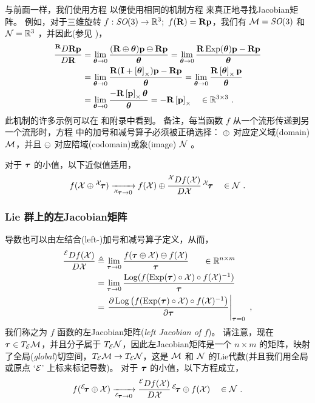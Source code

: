 与前面一样，我们使用方程  以便使用相同的机制方程  来真正地寻找Jacobian矩阵。
%
%
%
例如，对于三维旋转 $f:\textit{SO}(3)\to{\mathbb R}^3;~f({\bf R})={\bf R}{\bf p}$，我们有 $\mathcal{M}=\textit{SO}(3)$ 和 $\mathcal{N}={\mathbb R}^3$ ，并因此(参见 )， 
%
\begin{align*}
\rdpar{\bfR\bfp}{\bfR}
 &= \lim_{\bth\to0}\frac{(\bfR\op\bth)\bfp\om\bfR\bfp}{\bth} 
 = \lim_{\bth\to0}\frac{\bfR\Exp(\bth)\bfp-\bfR\bfp}{\bth} \\
 &= \lim_{\bth\to0}\frac{\bfR(\bfI+\hatx{\bth})\bfp-\bfR\bfp}{\bth} 
 = \lim_{\bth\to0}\frac{\bfR\hatx{\bth}\bfp}{\bth} \\
 &= \lim_{\bth\to0}\frac{-\bfR\hatx{\bfp}\bth}{\bth} 
 = -\bfR\hatx{\bfp} 
 ~~~\in \bbR^{3\times 3}
 ~.
\end{align*}
%
此机制的许多示例可以在  和附录中看到。
%
备注，每当函数 $f$ 从一个流形传递到另一个流形时，方程  中的加号和减号算子必须被正确选择：
$\oplus$ 对应定义域(domain) $\mathcal{M}$，并且 $\ominus$ 对应陪域(codomain)或象(image) $\mathcal{N}$ 。


对于 ${\bm \tau}$ 的小值，以下近似值适用，
%
\begin{align}\label{equ:lin_approx}
f(\cX\op{^\cX\!\bftau}) \xrightarrow[{^\cX\!\bftau}\to0]{} f(\cX)\op\rdpar{f(\cX)}{\cX}\,{^\cX\!\bftau}
\quad \in \cN
~.
\end{align}
%



\subsubsection{Lie 群上的左Jacobian矩阵}

导数也可以由左结合(left-)加号和减号算子定义，从而，
%
\begin{align}\label{equ:left-Jacobian}
\ldpar{f(\cX)}{\cX} 
& \te \lim_{\bftau\to0}\frac{f(\bftau\op\cX)\om f(\cX)}{\bftau}  
~~~~~\in\bbR^{n\times m}
\\
& = \lim_{\bftau\to0}\frac{\Log(f(\Exp(\bftau)\circ\cX) \circ f(\cX)\inv)}{\bftau} \notag
\\
&= \pjac{\Log\big(f(\Exp(\bftau)\circ\cX) \circ f(\cX)\inv\big)}{\bftau}{\bftau=0} \notag
~,
\end{align}
%
我们称之为 $f$ 函数的左Jacobian矩阵(\emph{left Jacobian of $f$})。
请注意，现在 ${\bm \tau}\in T_{\mathcal{E}}{\mathcal{M}}$，并且分子属于 $T_{\mathcal{E}}{\mathcal{N}}$，因此左Jacobian矩阵是一个 $n\times m$ 的矩阵，映射了全局(\emph{global})切空间，$T_{\mathcal{E}}{\mathcal{M}}\to T_{\mathcal{E}}{\mathcal{N}}$，这是 $\mathcal{M}$ 和 $\mathcal{N}$ 的Lie代数(并且我们用全局或原点 `$\mathcal{E}$' 上标来标记导数)。
对于 ${\bm \tau}$ 的小值，以下方程成立，
%
\begin{align}\label{equ:lin_approx_left}
f({^\cE\!\bftau}\op\cX) \xrightarrow[{^\cE\!\bftau}\to0]{} \ldpar{f(\cX)}{\cX}\,{^\cE\!\bftau} \op f(\cX)
\quad \in \cN
~.
\end{align}

